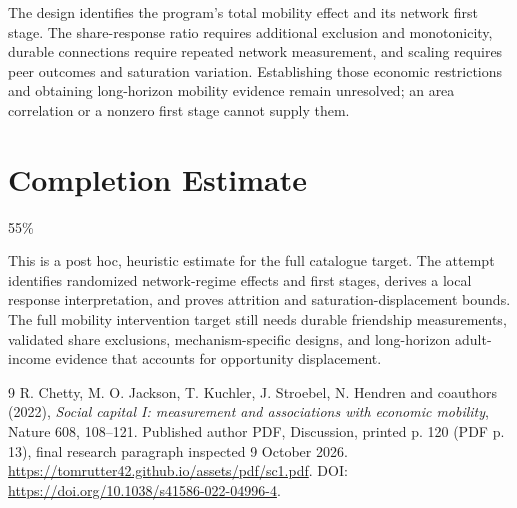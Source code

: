\documentclass[11pt]{article}
\theoremstyle{remark}\newtheorem{remark}[theorem]{Remark}
\begin{document}
The design identifies the program's total mobility effect and its network first stage. The share-response ratio requires additional exclusion and monotonicity, durable connections require repeated network measurement, and scaling requires peer outcomes and saturation variation. Establishing those economic restrictions and obtaining long-horizon mobility evidence remain unresolved; an area correlation or a nonzero first stage cannot supply them.

\section{Completion Estimate}
55\%

This is a post hoc, heuristic estimate for the full catalogue target.
The attempt identifies randomized network-regime effects and first stages, derives a local response interpretation, and proves attrition and saturation-displacement bounds. The full mobility intervention target still needs durable friendship measurements, validated share exclusions, mechanism-specific designs, and long-horizon adult-income evidence that accounts for opportunity displacement.

\begin{thebibliography}{9}
 R. Chetty, M. O. Jackson, T. Kuchler, J. Stroebel, N. Hendren and coauthors (2022), \emph{Social capital I: measurement and associations with economic mobility}, Nature 608, 108--121. Published author PDF, Discussion, printed p. 120 (PDF p. 13), final research paragraph inspected 9 October 2026. \url{https://tomrutter42.github.io/assets/pdf/sc1.pdf}. DOI: \url{https://doi.org/10.1038/s41586-022-04996-4}.
\end{thebibliography}
\end{document}
